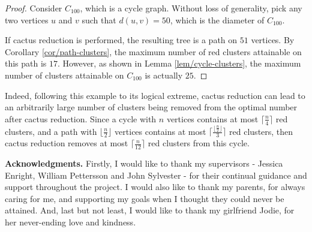 \documentclass{mpaper}
\begin{document}
\begin{proof}
  Consider $C_100$, which is a cycle graph. Without loss of generality, pick any two vertices $u$ and $v$ such that $d(u,v) = 50$, which is the diameter of $C_100$.

  If cactus reduction is performed, the resulting tree is a path on $51$ vertices. By Corollary \ref{cor/path-clusters}, the maximum number of red clusters attainable on this path is $17$. However, as shown in Lemma \ref{lem/cycle-clusters}, the maximum number of clusters attainable on $C_100$ is actually $25$.

\end{proof}

Indeed, following this example to its logical extreme, cactus reduction can lead to an arbitrarily large number of clusters being removed from the optimal number after cactus reduction. Since a cycle with $n$ vertices contains at most $\lceil \frac{n}{4} \rceil$ red clusters, and a path with $\lfloor \frac{n}{2} \rfloor$ vertices contains at most $\lceil \frac{\lfloor \frac{n}{2} \rfloor}{3} \rceil$ red clusters, then cactus reduction removes at most $\lceil \frac{n}{12} \rceil$ red clusters from this cycle.


{\bf Acknowledgments.}
Firstly, I would like to thank my supervisors - Jessica Enright, William Pettersson and John Sylvester - for their continual guidance and support throughout the project. I would also like to thank my parents, for always caring for me, and supporting my goals when I thought they could never be attained. And, last but not least, I would like to thank my girlfriend Jodie, for her never-ending love and kindness.



\end{document}
